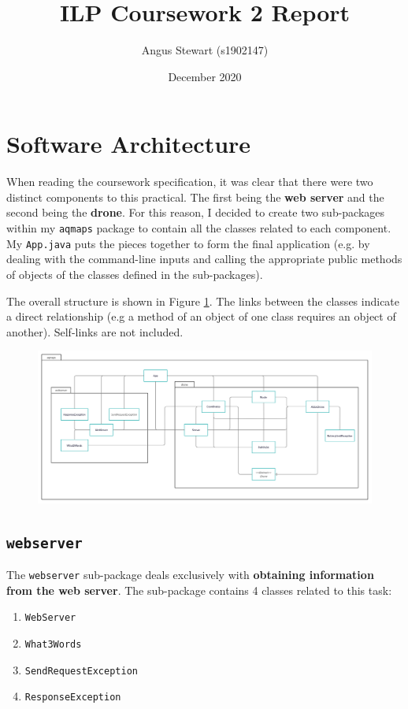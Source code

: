 \documentclass[11pt]{article}
\title{ILP Coursework 2 Report}
\author{Angus Stewart (s1902147)}
\date{December 2020}
\begin{document}
\maketitle
\thispagestyle{empty}

\newpage

\tableofcontents

\newpage
{}

\section{Software Architecture}
When reading the coursework specification, it was clear that there were two distinct components to this practical. The first being the \textbf{web server} and the second being the \textbf{drone}. For this reason, I decided to create two sub-packages within my \texttt{aqmaps} package to contain all the classes related to each component. My \texttt{App.java} puts the pieces together to form the final application (e.g. by dealing with the command-line inputs and calling the appropriate public methods of objects of the classes defined in the sub-packages).

The overall structure is shown in Figure \ref{fig:uml}. The links between the classes indicate a direct relationship (e.g a method of an object of one class requires an object of another). Self-links are not included.
\begin{figure}[h]
    \centering
    \includegraphics[width=\textwidth]{class-diagram}
    \label{fig:uml}
\end{figure}

\subsection{\texttt{webserver}}
The \texttt{webserver} sub-package deals exclusively with \textbf{obtaining information from the web server}. The sub-package contains 4 classes related to this task:
\begin{enumerate}[topsep=0pt, itemsep=0pt]
    \item \texttt{WebServer}
    \item \texttt{What3Words}
    \item \texttt{SendRequestException}
    \item \texttt{ResponseException}
\end{enumerate}
\end{document}
